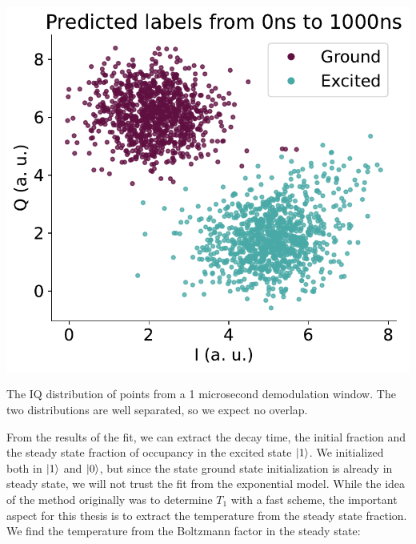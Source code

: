 \begin{marginfigure}
    \centering
    \includegraphics{projects/in_measurement_calibration/Distributions_long_pulse.pdf}
    \caption{The IQ distribution of points from a 1 microsecond demodulation window. The two distributions are well separated, so we expect no overlap.}
    \label{fig:IQ_distribution_temp}
\end{marginfigure}
From the results of the fit, we can extract the decay time, the initial fraction and the steady state fraction of occupancy in the excited state $\ket{1}$. We initialized both in $\ket{1}$ and $\ket{0}$, but since the state ground state initialization is already in steady state, we will not trust the fit from the exponential model. While the idea of the method originally was to determine $T_1$ with a fast scheme, the important aspect for this thesis is to extract the temperature from the steady state fraction. We find the temperature from the Boltzmann factor in the steady state:
